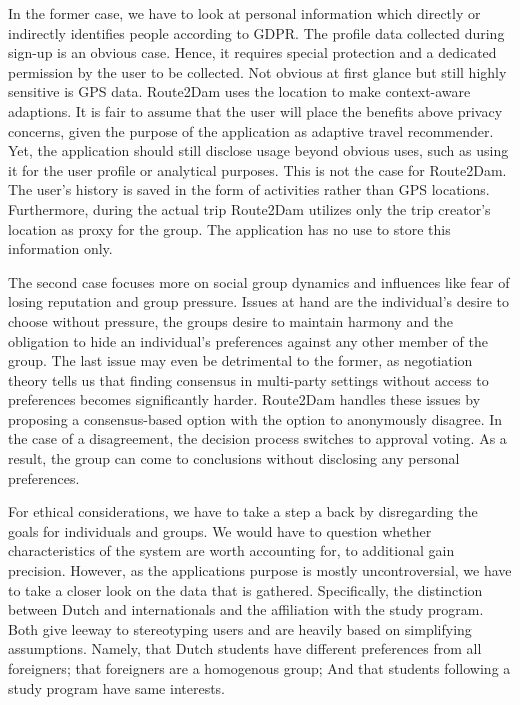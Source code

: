 \documentclass[11pt,a4paper,oneside]{article}
\begin{document}
In the former case, we have to look at personal information which directly or indirectly identifies people according to GDPR. The profile data collected during sign-up is an obvious case. Hence, it requires special protection and a dedicated permission by the user to be collected. Not obvious at first glance but still highly sensitive is GPS data. Route2Dam uses the location to make context-aware adaptions. It is fair to assume that the user will place the benefits above privacy concerns, given the purpose of the application as adaptive travel recommender. Yet, the application should still disclose usage beyond obvious uses, such as using it for the user profile or analytical purposes. This is not the case for Route2Dam. The user's history is saved in the form of activities rather than GPS locations. Furthermore, during the actual trip Route2Dam utilizes only the trip creator's location as proxy for the group. The application has no use to store this information only.

The second case focuses more on social group dynamics and influences like fear of losing reputation and group pressure.\cite{CITE-ASCH} Issues at hand are the individual's desire to choose without pressure, the groups desire to maintain harmony and the obligation to hide an individual's preferences against any other member of the group. The last issue may even be detrimental to the former, as negotiation theory tells us that finding consensus in multi-party settings without access to preferences becomes significantly harder.\cite{CITE} Route2Dam handles these issues by proposing a consensus-based option with the option to anonymously disagree. In the case of a disagreement, the decision process switches to approval voting. As a result, the group can come to conclusions without disclosing any personal preferences.  

For ethical considerations, we have to take a step a back by disregarding the goals for individuals and groups. We would have to question whether characteristics of the system are worth accounting for, to additional gain precision. However, as the applications purpose is mostly uncontroversial, we have to take a closer look on the data that is gathered. Specifically, the distinction between Dutch and internationals and the affiliation with the study program. Both give leeway to stereotyping users and are heavily based on simplifying assumptions. Namely, that Dutch students have different preferences from all foreigners; that foreigners are a homogenous group; And that students following a study program have same interests.  
\end{document}
